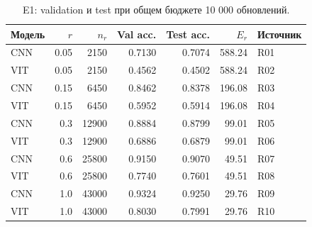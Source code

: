 \begin{table}[H]\centering\small
\setlength{\tabcolsep}{4pt}
\caption{E1: validation и test при общем бюджете 10 000 обновлений.}\label{tab:e1}
\begin{tabular}{lrrrrrl}
\toprule
Модель & $r$ & $n_r$ & Val acc. & Test acc. & $E_r$ & Источник \\
\midrule
CNN & 0.05 & 2150 & 0.7130 & 0.7074 & 588.24 & R01 \\
VIT & 0.05 & 2150 & 0.4562 & 0.4502 & 588.24 & R02 \\
CNN & 0.15 & 6450 & 0.8462 & 0.8378 & 196.08 & R03 \\
VIT & 0.15 & 6450 & 0.5952 & 0.5914 & 196.08 & R04 \\
CNN & 0.3 & 12900 & 0.8884 & 0.8799 & 99.01 & R05 \\
VIT & 0.3 & 12900 & 0.6886 & 0.6879 & 99.01 & R06 \\
CNN & 0.6 & 25800 & 0.9150 & 0.9070 & 49.51 & R07 \\
VIT & 0.6 & 25800 & 0.7740 & 0.7601 & 49.51 & R08 \\
CNN & 1.0 & 43000 & 0.9324 & 0.9250 & 29.76 & R09 \\
VIT & 1.0 & 43000 & 0.8030 & 0.7991 & 29.76 & R10 \\
\bottomrule
\end{tabular}
\end{table}
